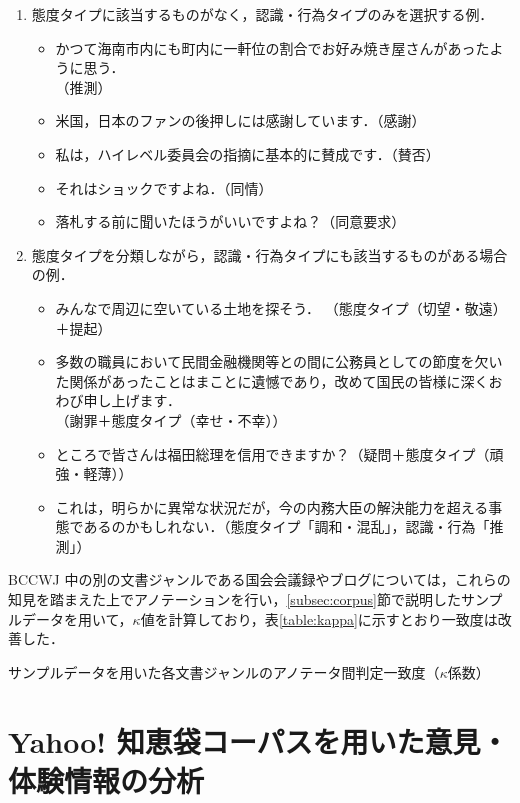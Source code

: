 \documentclass[japanese]{jnlp_1.4}
\begin{document}
\begin{enumerate}
\item 態度タイプに該当するものがなく，認識・行為タイプのみを選択する例．

\begin{itemize}
\item かつて海南市内にも町内に一軒位の割合でお好み焼き屋さんがあったように思う．\\
	\hfill （推測）
\item 米国，日本のファンの後押しには感謝しています．\hfill （感謝）
\item 私は，ハイレベル委員会の指摘に基本的に賛成です．\hfill （賛否）
\item それはショックですよね．\hfill （同情）
\item 落札する前に聞いたほうがいいですよね？\hfill （同意要求）
\end{itemize}

\item 態度タイプを分類しながら，認識・行為タイプにも該当するものがある場合の例．

\begin{itemize}
\item みんなで周辺に空いている土地を探そう． \hfill （態度タイプ（切望・敬遠）＋提起）
\item 多数の職員において民間金融機関等との間に公務員としての節度を欠いた関係があったことはまことに遺憾であり，改めて国民の皆様に深くおわび申し上げます．\\
	\hfill （謝罪＋態度タイプ（幸せ・不幸））
\item ところで皆さんは福田総理を信用できますか？\hfill （疑問＋態度タイプ（頑強・軽薄））
\item これは，明らかに異常な状況だが，今の内務大臣の解決能力を超える事態であるのかもしれない．\hfill （態度タイプ「調和・混乱」，認識・行為「推測」）
\end{itemize}
\end{enumerate}
BCCWJ 中の別の文書ジャンルである国会会議録やブログについては，これらの知見を踏まえた上でアノテーションを行い，\ref{subsec:corpus}節で説明したサンプルデータを用いて，$\kappa$値を計算しており，表\ref{table:kappa}に示すとおり一致度は改善した．

\begin{table}[t]
\caption{サンプルデータを用いた各文書ジャンルのアノテータ間判定一致度（$\kappa$係数）}
\label{table:kappa}

\end{table}


\section{Yahoo! 知恵袋コーパスを用いた意見・体験情報の分析}
\label{sec:analysis}
\end{document}
